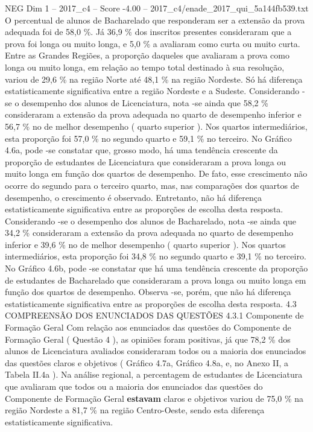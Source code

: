 \begin{textsample}{NEG Dim 1 – 2017\_c4 – Score -4.00 – 2017\_c4/enade\_2017\_qui\_5a144fb539.txt}
O percentual de alunos de Bacharelado que responderam ser a extensão da prova adequada foi de 58,0 \%.
Já 36,9 \% dos inscritos presentes consideraram que a prova foi longa ou muito longa, e 5,0 \% a avaliaram como curta ou muito curta.
Entre as Grandes Regiões, a proporção daqueles que avaliaram a prova como longa ou muito longa, em relação ao tempo total destinado à sua resolução, variou de 29,6 \% na região Norte até 48,1 \% na região Nordeste.
Só há diferença estatisticamente significativa entre a região Nordeste e a Sudeste.
Considerando -se o desempenho dos alunos de Licenciatura, nota -se ainda que 58,2 \% consideraram a extensão da prova adequada no quarto de desempenho inferior e 56,7 \% no de melhor desempenho ( quarto superior ).
Nos quartos intermediários, esta proporção foi 57,0 \% no segundo quarto e 59,1 \% no terceiro.
No Gráfico 4.6a, pode -se constatar que, grosso modo, há uma tendência crescente da proporção de estudantes de Licenciatura que consideraram a prova longa ou muito longa em função dos quartos de desempenho.
De fato, esse crescimento não ocorre do segundo para o terceiro quarto, mas, nas comparações dos quartos de desempenho, o crescimento é observado.
Entretanto, não há diferença estatisticamente significativa entre as proporções de escolha desta resposta.
Considerando -se o desempenho dos alunos de Bacharelado, nota -se ainda que 34,2 \% consideraram a extensão da prova adequada no quarto de desempenho inferior e 39,6 \% no de melhor desempenho ( quarto superior ).
Nos quartos intermediários, esta proporção foi 34,8 \% no segundo quarto e 39,1 \% no terceiro.
No Gráfico 4.6b, pode -se constatar que há uma tendência crescente da proporção de estudantes de Bacharelado que consideraram a prova longa ou muito longa em função dos quartos de desempenho.
Observa -se, porém, que não há diferença estatisticamente significativa entre as proporções de escolha desta resposta. 4.3 COMPREENSÃO DOS ENUNCIADOS DAS QUESTÕES 4.3.1 Componente de Formação Geral Com relação aos enunciados das questões do Componente de Formação Geral ( Questão 4 ), as opiniões foram positivas, já que 78,2 \% dos alunos de Licenciatura avaliados consideraram todos ou a maioria dos enunciados das questões claros e objetivos ( Gráfico 4.7a, Gráfico 4.8a, e, no Anexo II, a Tabela II.4a ).
Na análise regional, a percentagem de estudantes de Licenciatura que avaliaram que todos ou a maioria dos enunciados das questões do Componente de Formação Geral \textbf{estavam} claros e objetivos variou de 75,0 \% na região Nordeste a 81,7 \% na região Centro-Oeste, sendo esta diferença estatisticamente significativa.

\end{textsample}
